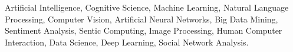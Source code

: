 {Artificial Intelligence, Cognitive Science, Machine Learning, Natural Language Processing, 
Computer Vision, Artificial Neural Networks, Big Data Mining, Sentiment Analysis, Sentic Computing, Image Processing, Human Computer Interaction, Data Science, Deep Learning, Social Network Analysis.}